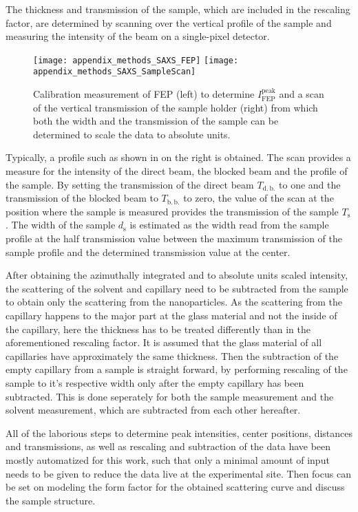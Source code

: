 \documentclass[\main/dresen_thesis.tex]{subfiles}
\begin{document}
    The thickness and transmission of the sample, which are included in the rescaling factor, are determined by scanning over the vertical profile of the sample and measuring the intensity of the beam on a single-pixel detector.
    \begin{figure}[tb]
      \centering
      \texttt{[image: appendix\_methods\_SAXS\_FEP]}
      \texttt{[image: appendix\_methods\_SAXS\_SampleScan]}
      \caption{\label{fig:appendix:methods:saxs:fep_scan}Calibration measurement of FEP (left) to determine $I_\mathrm{FEP}^\mathrm{peak}$ and a scan of the vertical transmission of the sample holder (right) from which both the width and the transmission of the sample can be determined to scale the data to absolute units.}
    \end{figure}
    Typically, a profile such as shown in  on the right is obtained.
    The scan provides a measure for the intensity of the direct beam, the blocked beam and the profile of the sample.
    By setting the transmission of the direct beam $T_\mathrm{d.\,b.}$ to one and the transmission of the blocked beam to $T_\mathrm{b.\,b.}$ to zero, the value of the scan at the position where the sample is measured provides the transmission of the sample $T_\mathrm{s}$.
    The width of the sample $d_\mathrm{s}$ is estimated as the width read from the sample profile at the half transmission value between the maximum transmission of the sample profile and the determined transmission value at the center.

    After obtaining the azimuthally integrated and to absolute units scaled intensity, the scattering of the solvent and capillary need to be subtracted from the sample to obtain only the scattering from the nanoparticles.
    As the scattering from the capillary happens to the major part at the glass material and not the inside of the capillary, here the thickness has to be treated differently than in the aforementioned rescaling factor.
    It is assumed that the glass material of all capillaries have approximately the same thickness.
    Then the subtraction of the empty capillary from a sample is straight forward, by performing rescaling of the sample to it's respective width only after the empty capillary has been subtracted.
    This is done seperately for both the sample measurement and the solvent measurement, which are subtracted from each other hereafter.

    All of the laborious steps to determine peak intensities, center positions, distances and transmissions, as well as rescaling and subtraction of the data have been mostly automatized for this work, such that only a minimal amount of input needs to be given to reduce the data live at the experimental site.
    Then focus can be set on modeling the form factor for the obtained scattering curve and discuss the sample structure.
\end{document}
